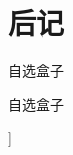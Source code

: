 \documentclass[color=BLUE]{textbook-cn}%
\begin{document}
\chapter{后记}
\lipsum
\lipsum
\cite{31}\cite{32}\cite{33}\cite{34}\cite{35}\cite{36}\cite{37}\cite{38}\cite{39}\cite{40}









\begin{box6}{自选盒子}
\lipsum[2][1-3]
\end{box6}


\begin{TCBCODE}
\begin{box6}{自选盒子}
\lipsum[2][1-3]
\end{box6}
\end{TCBCODE}








\makeback[code.png][\lipsum[1][1-6]]
\end{document}
